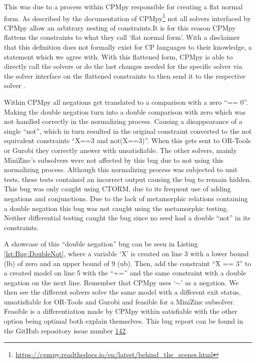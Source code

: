 This was due to a process within CPMpy responsible for creating a flat normal form. As described by the documentation of CPMpy\footnote{\url{https://cpmpy.readthedocs.io/en/latest/behind_the_scenes.html}} not all solvers interfaced by CPMpy allow an arbitrary nesting of constraints.It is for this reason CPMpy flattens the constraints to what they call ‘flat normal form’. With a disclaimer that this definition does not formally exist for CP languages to their knowledge, a statement which we agree with. With this flattened form, CPMpy is able to directly call the solvers or do the last changes needed for the specific solver via the solver interface on the flattened constraints to then send it to the respective solver \cite{CPMpyGithub}. 

Within CPMpy all negations get translated to a comparison with a zero “== 0”. Making the double negation turn into a double comparison with zero which was not handled correctly in the normalizing process. Causing a disappearance of a single “not”, which in turn resulted in the original constraint converted to the not equivalent constraints “X==3 and not(X==3)”. When this gets sent to OR-Tools or Gurobi they correctly answer with unsatisfiable. The other solvers, mainly MiniZinc’s subsolvers were not affected by this bug due to not using this normalizing process. Although this normalizing process was subjected to unit tests, these tests contained an incorrect output causing the bug to remain hidden. This bug was only caught using CTORM, due to its frequent use of adding negations and conjunctions. Due to the lack of metamorphic relations containing a double negation this bug was not caught using the metamorphic testing. Neither differential testing caught the bug since no seed had a double “not” in its constraints. 

A showcase of this “double negation” bug can be seen in Listing \ref{lst:Bug:DoubleNot}, where a variable ‘X’ is created on line 3 with a lower bound (lb) of zero and an upper bound of 9 (ub). Then, add the constraint “X == 3” to a created model on line 5 with the “+=” and the same constraint with a double negation on the next line. Remember that CPMpy uses ‘$\sim$’ as a negation. We then see the different solvers solve the same model with a different exit status, unsatisfiable for OR-Tools and Gurobi and feasible for a MiniZinc subsolver. Feasible is a differentiation made by CPMpy within satisfiable with the other option being optimal both explain themselves. This bug report can be found in the GitHub repository issue number \href{https://github.com/CPMpy/cpmpy/issues/142}{142}.


